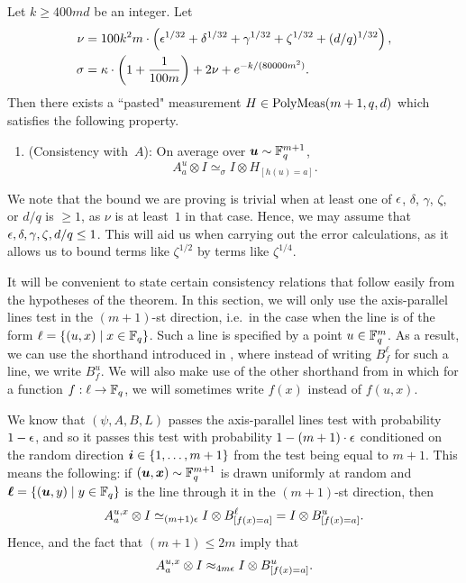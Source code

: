 \begin{theorem}[Pasting]
  Let $k \geq 400md$ be an integer. Let
 \begin{align*}
 \nu &= 100 k^2m \cdot \left(\epsilon^{1/32} + \delta^{1/32} + \gamma^{1/32} + \zeta^{1/32} + (d/q)^{1/32}\right),\\
 \sigma & = \kappa \cdot \left(1 + \frac{1}{100m}\right)
    + 2\nu + e^{- k/(80000m^2)}.
 \end{align*}
  Then there exists a ``pasted" measurement $H \in \mathrm{PolyMeas}(m+1, q, d)$ which satisfies the following property.
  \begin{enumerate}
  \item (Consistency with~$A$): \label{item:ld-pasting-N-consistency} On average over $\boldsymbol{u} \sim \mathbb F_q^{m+1}$,
	  \begin{equation*}
	  A^{u}_a \otimes I \simeq_{\sigma} I \otimes H_{[h(u)=a]}.
	  \end{equation*}
  \end{enumerate}
\end{theorem}

We note that the bound we are proving is trivial when at least one of $\epsilon$, $\delta$, $\gamma$, $\zeta$, or $d/q$ is $\geq 1$,
as $\nu$ is at least~$1$ in that case.
Hence, we may assume that $\epsilon,\delta,\gamma, \zeta, d/q \leq 1$.
This will aid us when carrying out the error calculations,
as it allows us to bound terms like $\zeta^{1/2}$ by terms like $\zeta^{1/4}$.

It will be convenient to state
certain consistency relations that follow easily from the hypotheses
of the theorem.
In this section, we will  only use the axis-parallel lines test in the $(m+1)$-st direction,
		i.e.\ in the case when the line is of the form $\ell = \{(u, x) \mid x \in \mathbb F_q\}$.
		Such a line is specified by a point $u \in \mathbb F_q^m$.
		As a result, we can use the shorthand introduced in ,
		where instead of writing $B^\ell_f$ for such a line, we write $B^u_f$.
		We will also make use of the other shorthand from 
		in which for a function $f:\ell \rightarrow \mathbb F_q$,
		we will sometimes write $f(x)$ instead of $f(u,x)$.
		
		We know that $(\psi, A, B, L)$ passes the axis-parallel lines test with probability $1-\epsilon$,
		and so it passes this test with probability $1-(m+1) \cdot \epsilon$ conditioned on the random 		direction $\boldsymbol{i} \in \{1, \ldots, m+1\}$ from the test
		being equal to $m+1$.
		This means the following: if $(\boldsymbol{u}, {\boldsymbol{x}}) \sim \mathbb F_q^{m+1}$ is drawn uniformly at random and $\boldsymbol{\ell} = \{(\boldsymbol{u}, y) \mid y \in \mathbb F_q\}$
		is the line through it in the $(m+1)$-st direction, then
		\begin{equation*}
		A^{u, x}_a \otimes I \simeq_{(m+1) \epsilon} I \otimes B^{\ell}_{[f(x)=a]} = I \otimes B^u_{[f(x)=a]}.
		\end{equation*}
		Hence,  and the fact that $(m+1) \leq 2m$ imply that
		\begin{equation*}
		A^{u, x}_a \otimes I \approx_{4m \epsilon} I \otimes B^u_{[f(x)=a]}.
		\end{equation*}

